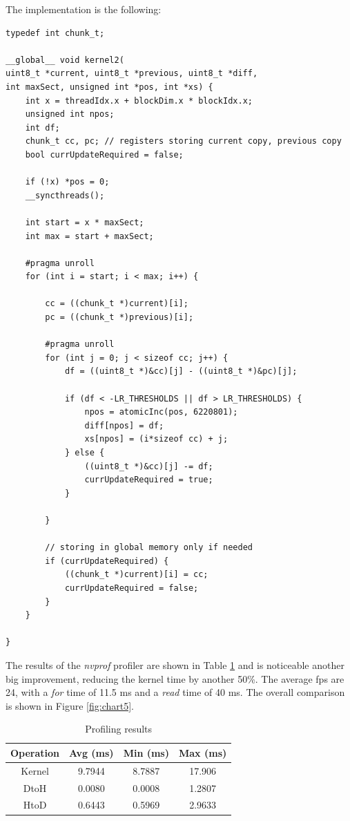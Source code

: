 \documentclass[paper=a4, fontsize=10pt]{scrartcl}	%
\begin{document}
	The implementation is the following:

	\begin{lstlisting}[style=CStyle]
typedef int chunk_t;

__global__ void kernel2(
uint8_t *current, uint8_t *previous, uint8_t *diff, 
int maxSect, unsigned int *pos, int *xs) {
    int x = threadIdx.x + blockDim.x * blockIdx.x;
    unsigned int npos;
    int df;
    chunk_t cc, pc; // registers storing current copy, previous copy
    bool currUpdateRequired = false;

    if (!x) *pos = 0;
    __syncthreads();

    int start = x * maxSect;
    int max = start + maxSect;

    #pragma unroll
    for (int i = start; i < max; i++) {

        cc = ((chunk_t *)current)[i];
        pc = ((chunk_t *)previous)[i];

        #pragma unroll
        for (int j = 0; j < sizeof cc; j++) {
            df = ((uint8_t *)&cc)[j] - ((uint8_t *)&pc)[j];

            if (df < -LR_THRESHOLDS || df > LR_THRESHOLDS) {
                npos = atomicInc(pos, 6220801);
                diff[npos] = df;
                xs[npos] = (i*sizeof cc) + j;
            } else {
                ((uint8_t *)&cc)[j] -= df;
                currUpdateRequired = true;
            }

        }

        // storing in global memory only if needed
        if (currUpdateRequired) {
        	((chunk_t *)current)[i] = cc;
        	currUpdateRequired = false;
        }
    }

}
	\end{lstlisting}

	The results of the \textit{nvprof} profiler are shown in Table \ref{tab:nvprof_naif5} and is noticeable another big improvement, reducing the kernel time by another 50\%. The average fps are 24, with a \textit{for} time of 11.5 ms and a \textit{read} time of 40 ms. The overall comparison is shown in Figure \ref{fig:chart5}.

	\begin{table}[H]
		\centering
		\begin{tabular}{||c | c c c||} 
			\hline
			Operation & Avg (ms) & Min (ms) & Max (ms) \\ [0.5ex] 
			\hline\hline
			Kernel & 9.7944 & 8.7887 & 17.906 \\ 
			\hdashline
			DtoH & 0.0080 & 0.0008 & 1.2807 \\
			\hdashline
			HtoD & 0.6443 & 0.5969 & 2.9633 \\
			\hline
		\end{tabular}
		\caption{Profiling results}
		\label{tab:nvprof_naif5}
	\end{table}
\end{document}
